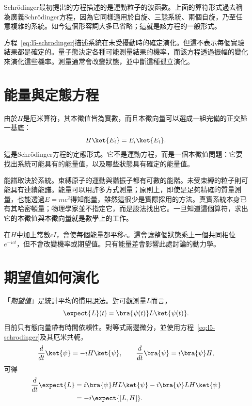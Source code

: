 Schr\"odinger最初提出的方程描述的是運動粒子的波函數。上面的算符形式過去稱為廣義Schr\"odinger方程，因為它同樣適用於自旋、三態系統、兩個自旋，乃至任意複雜的系統。如今這個形容詞大多已省略；這就是該方程的一般形式。

方程~\eqref{eq:l5-schrodinger}描述系統在未受擾動時的確定演化。但這不表示每個實驗結果都是確定的。量子態決定各種可能測量結果的機率，而該方程透過振幅的變化來演化這些機率。測量通常會改變狀態，並中斷這種孤立演化。

\begin{classroomqa}
\end{classroomqa}

\section{能量與定態方程}

由於\(H\)是厄米算符，其本徵值皆為實數，而且本徵向量可以選成一組完備的正交歸一基底：
\begin{equation}
H\ket{E_i}=E_i\ket{E_i}.
\label{eq:l5-time-independent}
\end{equation}
這是Schr\"odinger方程的定態形式。它不是運動方程，而是一個本徵值問題：它要找出系統可能具有的能量值，以及哪些狀態具有確定的能量值。

能譜取決於系統。束縛原子的運動與諧振子都有可數的能階。未受束縛的粒子則可能具有連續能譜。能量可以用許多方式測量；原則上，即使是足夠精確的質量測量，也能透過\(E=mc^2\)得知能量，雖然這很少是實際採用的方法。真實系統本身已有其哈密頓量；物理學家並不指定它，而是設法找出它。一旦知道這個算符，求出它的本徵值與本徵向量就是數學上的工作。

在\(H\)中加上常數\(cI\)，會使每個能量都平移\(c\)。這會讓整個狀態乘上一個共同相位\(e^{-ict}\)，但不會改變機率或期望值。只有能量差會影響此處討論的動力學。

\section{期望值如何演化}

「\emph{期望值}」是統計平均的慣用說法。對可觀測量\(L\)而言，
\begin{equation}
\expect{L}(t)=\bra{\psi(t)}L\ket{\psi(t)}.
\end{equation}
目前只有態向量帶有時間依賴性。對等式兩邊微分，並使用方程~\eqref{eq:l5-schrodinger}及其厄米共軛，
\begin{equation}
\frac{d}{dt}\ket{\psi}=-iH\ket{\psi},
\qquad
\frac{d}{dt}\bra{\psi}=i\bra{\psi}H,
\end{equation}
可得
\begin{align}
\frac{d}{dt}\expect{L}
&=i\bra{\psi}HL\ket{\psi}
  -i\bra{\psi}LH\ket{\psi}\\
&=-i\expect{[L,H]}.
\label{eq:l5-expectation-motion}
\end{align}

